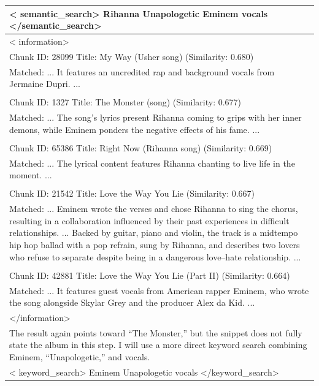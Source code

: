 \documentclass[11pt]{article}
\begin{document}
\begin{longtable}{|p{}|}
\hline
\textless{} semantic\_search\textgreater{} Rihanna Unapologetic Eminem vocals \textless{}/semantic\_search\textgreater{} \\
\hline
\textless{} information\textgreater{} \\
Chunk ID: 28099 \textbar{} Title: My Way (Usher song) (Similarity: 0.680) \\
Matched: ... It features an uncredited rap and background vocals from Jermaine Dupri. ... \\
\\
Chunk ID: 1327 \textbar{} Title: The Monster (song) (Similarity: 0.677) \\
Matched: ... The song's lyrics present Rihanna coming to grips with her inner demons, while Eminem ponders the negative effects of his fame. ... \\
\\
Chunk ID: 65386 \textbar{} Title: Right Now (Rihanna song) (Similarity: 0.669) \\
Matched: ... The lyrical content features Rihanna chanting to live life in the moment. ... \\
\\
Chunk ID: 21542 \textbar{} Title: Love the Way You Lie (Similarity: 0.667) \\
Matched: ... Eminem wrote the verses and chose Rihanna to sing the chorus, resulting in a collaboration influenced by their past experiences in difficult relationships. ... Backed by guitar, piano and violin, the track is a midtempo hip hop ballad with a pop refrain, sung by Rihanna, and describes two lovers who refuse to separate despite being in a dangerous love--hate relationship. ... \\
\\
Chunk ID: 42881 \textbar{} Title: Love the Way You Lie (Part II) (Similarity: 0.664) \\
Matched: ... It features guest vocals from American rapper Eminem, who wrote the song alongside Skylar Grey and the producer Alex da Kid. ... \\
\textless{}/information\textgreater{} \\
\hline
The result again points toward ``The Monster,'' but the snippet does not fully state the album in this step. I will use a more direct keyword search combining Eminem, ``Unapologetic,'' and vocals. \\
\hline
\textless{} keyword\_search\textgreater{} Eminem Unapologetic vocals \textless{}/keyword\_search\textgreater{} \\
\hline

\end{longtable}
\end{document}
